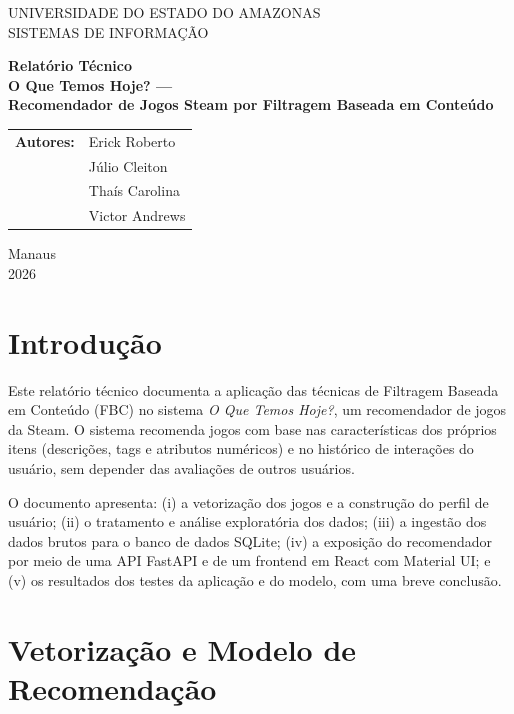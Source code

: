 \documentclass[12pt,a4paper]{article}
\begin{document}
\begin{titlepage}
\centering
\vspace*{1cm}
{\large UNIVERSIDADE DO ESTADO DO AMAZONAS}\\[0.3cm]
{\large SISTEMAS DE INFORMAÇÃO}

\vspace{3.5cm}
{\LARGE\bfseries Relatório Técnico\\[0.4cm]
O Que Temos Hoje? —\\[0.2cm]
Recomendador de Jogos Steam por Filtragem Baseada em Conteúdo}

\vspace{3cm}
\begin{tabular}{rl}
{\large \textbf{Autores:}} & Erick Roberto \\
& Júlio Cleiton \\
& Thaís Carolina \\
& Victor Andrews \\
\end{tabular}

\vfill
{\large Manaus\\
2026}
\end{titlepage}

\tableofcontents
\newpage

\section{Introdução}

Este relatório técnico documenta a aplicação das técnicas de Filtragem Baseada em Conteúdo (FBC) no sistema \textit{O Que Temos Hoje?}, um recomendador de jogos da Steam. O sistema recomenda jogos com base nas características dos próprios itens (descrições, tags e atributos numéricos) e no histórico de interações do usuário, sem depender das avaliações de outros usuários.

O documento apresenta: (i) a vetorização dos jogos e a construção do perfil de usuário; (ii) o tratamento e análise exploratória dos dados; (iii) a ingestão dos dados brutos para o banco de dados SQLite; (iv) a exposição do recomendador por meio de uma API FastAPI e de um frontend em React com Material UI; e (v) os resultados dos testes da aplicação e do modelo, com uma breve conclusão.

\section{Vetorização e Modelo de Recomendação}
\end{document}
